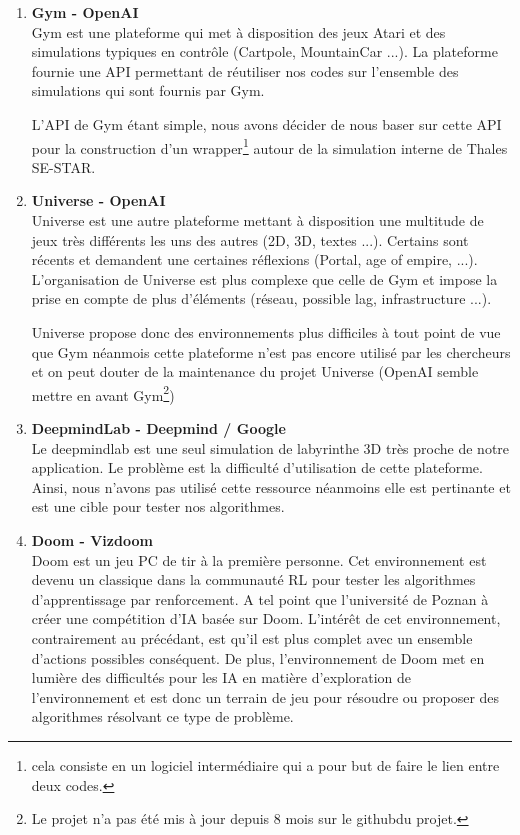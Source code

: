 \begin{enumerate}
    \item \textbf{Gym\cite{1606.01540} - OpenAI}\\
        Gym est une plateforme qui met à disposition des jeux Atari et des simulations typiques en contrôle (Cartpole, MountainCar ...). La plateforme fournie une \gls{API} permettant de réutiliser nos codes sur l'ensemble des simulations qui sont fournis par Gym.
    
        L'\gls{API} de Gym étant simple, nous avons décider de nous baser sur cette API pour la construction d'un wrapper\footnote{cela consiste en un logiciel intermédiaire qui a pour but de faire le lien entre deux codes.} autour de la simulation interne de Thales SE-STAR.
    
    \item \textbf{Universe - OpenAI}\\
    Universe est une autre plateforme mettant à disposition une multitude de jeux très différents les uns des autres (2D, 3D, textes ...). Certains sont récents et demandent une certaines réflexions (Portal, age of empire, ...). L'organisation de Universe est plus complexe que celle de Gym et impose la prise en compte de plus d'éléments (réseau, possible lag, infrastructure ...). 
    
    Universe propose donc des environnements plus difficiles à tout point de vue que Gym néanmois cette plateforme n'est pas encore utilisé par les chercheurs et on peut douter de la maintenance du projet Universe (OpenAI semble mettre en avant Gym\footnote{Le projet n'a pas été mis à jour depuis 8 mois sur le githubdu projet.})
    
    \item \textbf{DeepmindLab\cite{DBLP:journals/corr/BeattieLTWWKLGV16} - Deepmind / Google }\\
        Le deepmindlab est une seul simulation de labyrinthe 3D très proche de notre application. Le problème est la difficulté d'utilisation de cette plateforme. Ainsi, nous n'avons pas utilisé cette ressource néanmoins elle est pertinante et est une cible pour tester nos algorithmes.
    
    \item \textbf{Doom - Vizdoom\cite{DBLP:journals/corr/KempkaWRTJ16}  }\\
        Doom est un jeu PC de tir à la première personne. Cet environnement est devenu un classique dans la communauté \gls{RL} pour tester les algorithmes d'apprentissage par renforcement. A tel point que l'université de Poznan à créer une compétition d'\gls{IA} basée sur Doom. L'intérêt de cet environnement, contrairement au précédant, est qu'il est plus complet avec un ensemble d'actions possibles conséquent. De plus, l'environnement de Doom met en lumière des difficultés pour les \gls{IA} en matière d'exploration de l'environnement et est donc un terrain de jeu pour résoudre ou proposer des algorithmes résolvant ce type de problème.
    

\end{enumerate}

